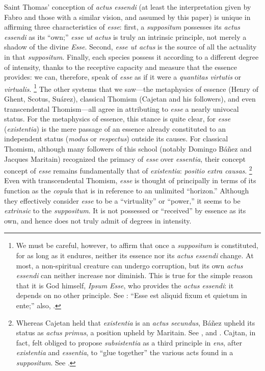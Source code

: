 Saint Thomas’ conception of \emph{actus essendi} (at least the interpretation given by Fabro and those with a similar vision, and assumed by this paper) is unique in affirming three characteristics of \emph{esse}: first, a \emph{suppositum} possesses its \emph{actus essendi} as its “own;” \emph{esse ut actus} is truly an intrinsic principle, not merely a shadow of the divine \emph{Esse}. Second, \emph{esse ut actus} is the source of all the actuality in that \emph{suppositum}. Finally, each species possess it according to a different degree of intensity, thanks to the receptive capacity and measure that the essence provides: we can, therefore, speak of \emph{esse} as if it were a \emph{quantitas virtutis} or \emph{virtualis}.%
%
\footnote{We must be careful, however, to affirm that once a \emph{suppositum} is constituted, for as long as it endures, neither its essence nor its \emph{actus essendi} change. At most, a non-spiritual creature can undergo corruption, but its own \emph{actus essendi} can neither increase nor diminish. This is true for the simple reason that it is God himself, \emph{Ipsum Esse}, who provides the \emph{actus essendi}: it depends on no other principle. See \cite[I, cap.~20, n.~27 (Marietti n.~179)]{st:contragent}: “Esse est aliquid fixum et quietum in ente;” also, \cite[37]{contat:esse-essentia-ordo}.} The other systems that we saw—the metaphysics of essence (Henry of Ghent, Scotus, Suárez), classical Thomism (Cajetan and his followers), and even transcendental Thomism—all agree in attributing to \emph{esse} a nearly univocal status. For the metaphysics of essence, this stance is quite clear, for \emph{esse} (\emph{existentia}) is the mere passage of an essence already constituted to an independent status (\emph{modus} or \emph{respectus}) outside its causes. For classical Thomism, although many followers of this school (notably Domingo Báñez and Jacques Maritain) recognized the primacy of \emph{esse} over \emph{essentia}, their concept concept of \emph{esse} remains fundamentally that of \emph{existentia}: \emph{positio extra causas}.%
%
\footnote{Whereas Cajetan held that \emph{existentia} is an \emph{actus secundus}, Báñez upheld its status as \emph{actus primus}, a position upheld by Maritain. See \cite[612–613]{fabro:partecipazione}, and \cite[109-111]{contat:figure}. Cajtan, in fact, felt obliged to propose \emph{subsistentia} as a third principle in \emph{ens}, after \emph{existentia} and \emph{essentia}, to “glue together” the various acts found in a \emph{suppositum}. See \cite[617]{fabro:partecipazione}.} Even with transcendental Thomism, \emph{esse} is thought of principally in terms of its function as the \emph{copula} that is in reference to an unlimited “horizon.” Although they effectively consider \emph{esse} to be a “virtuality” or “power,” it seems to be \emph{extrinsic} to the \emph{suppositum}. It is not possessed or “received” by essence as its own, and hence does not truly admit of degrees in intensity.%
